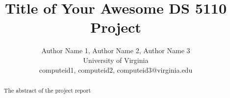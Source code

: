 \documentclass[letterpaper,twocolumn,10pt]{article}
\begin{document}

\date{}

\title{\Large \bf Title of Your Awesome DS 5110 Project}

\author{
	Author Name 1, Author Name 2, Author Name 3\\
	{University of Virginia}\\
	{computeid1, computeid2, computeid3}@virginia.edu
} 

\maketitle

\begin{abstract}
The abstract of the project report
\end{abstract}










\end{document}
